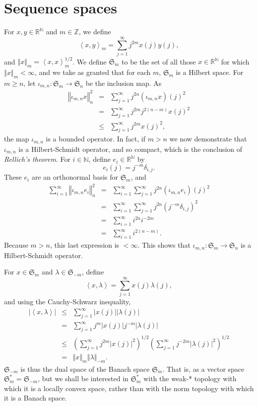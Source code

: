 \documentclass{article}
\newcommand{\inner}[2]{\left\langle #1, #2 \right\rangle}
\newcommand{\norm}[1]{\left\Vert #1 \right\Vert}
\theoremstyle{definition}
\theoremstyle{definition}
\begin{document}
\section{Sequence spaces} 
For $x,y \in \mathbb{R}^{\mathbb{N}}$ and $m \in \mathbb{Z}$, we define
\[
\inner{x}{y}_m =\sum_{j=1}^\infty j^{2m} x(j) y(j),
\]
and $\norm{x}_m = \inner{x}{x}_m^{1/2}$.
We define $\mathfrak{S}_m$ to be the set of all those $x \in \mathbb{R}^{\mathbb{N}}$ for which $\norm{x}_m<\infty$, and we take as granted that for each $m$, $\mathfrak{S}_m$
is a Hilbert space. For $m \geq n$, let $\iota_{m,n}:\mathfrak{S}_m \to \mathfrak{S}_n$ be the inclusion map. As
\begin{eqnarray*}
\norm{\iota_{m,n} x}_n^2 &=& \sum_{j=1}^\infty j^{2n} (\iota_{m,n} x)(j)^2\\
&=& \sum_{j=1}^\infty j^{2m} j^{2(n-m)} x(j)^2\\
&\leq&\sum_{j=1}^\infty j^{2m} x(j)^2, 
\end{eqnarray*}
the map
$\iota_{m,n}$ is a bounded operator.
In fact, if $m>n$ we now demonstrate that $\iota_{m,n}$ is a Hilbert-Schmidt operator, and so compact, which is the conclusion of {\em Rellich's theorem}.
For $i \in \mathbb{N}$, define $e_i \in \mathbb{R}^{\mathbb{N}}$
by 
\[
e_i(j) =j^{-m}  \delta_{i,j}.
\]
These $e_i$ are an orthonormal basis for $\mathfrak{S}_m$, and 
\begin{eqnarray*}
\sum_{i=1}^\infty \norm{\iota_{m,n} e_i}_n^2&=&\sum_{i=1}^\infty \sum_{j=1}^\infty j^{2n} (\iota_{m,n} e_i)(j)^2\\
&=&\sum_{i=1}^\infty \sum_{j=1}^\infty j^{2n} \left(  j^{-m}\delta_{i,j}\right)^2\\
&=&\sum_{i=1}^\infty  i^{2n} i^{-2m}\\
&=&\sum_{i=1}^\infty i^{2(n-m)}.
\end{eqnarray*}
Because $m>n$, this last expression is $<\infty$. This shows that $\iota_{m,n}:\mathfrak{S}_m \to \mathfrak{S}_n$ is a Hilbert-Schmidt operator.



For $x \in \mathfrak{S}_m$ and $\lambda \in \mathfrak{S}_{-m}$, define
\begin{equation}
\inner{x}{\lambda}=\sum_{j=1}^\infty x(j) \lambda(j),
\label{dualpairing}
\end{equation}
and using the Cauchy-Schwarz inequality,
\begin{eqnarray*}
|\inner{x}{\lambda}|&\leq&\sum_{j =1}^\infty |x(j)| |\lambda(j)|\\
&=&\sum_{j =1}^\infty j^m |x(j)| j^{-m} |\lambda(j)|\\
&\leq&\left(\sum_{j=1}^\infty j^{2m} |x(j)|^2 \right)^{1/2} \left( \sum_{j=1}^\infty j^{-2m} |\lambda(j)|^2 \right)^{1/2}\\
&=&\norm{x}_m \norm{\lambda}_{-m}.
\end{eqnarray*}
$\mathfrak{S}_{-m}$ is thus the dual space of the Banach space $\mathfrak{S}_m$. That is, as a vector space $\mathfrak{S}_m^* = \mathfrak{S}_{-m}$, but
we shall be interested in $\mathfrak{S}_m^*$ with the weak-* topology with which it is a locally convex space, rather than with the norm topology with which it is a Banach space.
\end{document}
